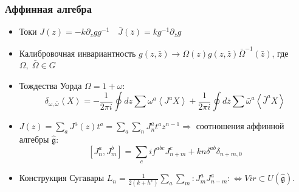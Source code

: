 \documentclass[pdftex]{beamer}
\newcommand{\gfh}{\hat{\mathfrak{g}}}
\theoremstyle{definition} \newtheorem{Def}{Definition}
\begin{document}
\begin{frame}
  \frametitle{Аффинная алгебра}

  \begin{itemize}
  \item   Токи 
    $J(z)= -k \partial_zg g^{-1}\quad \bar J(\bar z)=k g^{-1}\partial_{\bar z}g$

  \item Калибровочная инвариантность $   g(z,\bar z)\to \Omega(z)g(z,\bar z)\bar \Omega^{-1}(\bar z)$,
    где $\Omega,\;\bar \Omega \in G$

  \item Тождества Уорда $\Omega=1+\omega$:
    \begin{equation*}
      \label{eq:87}
      \delta_{\omega,\bar \omega}\left< X \right>=-\frac{1}{2\pi i}\oint dz \sum\omega^a \left< J^a X\right>+
      \frac{1}{2\pi i} \oint d\bar z \sum \bar \omega^a \left< \bar J^a X\right>
    \end{equation*}
  \item  $J(z)=\sum_{a} J^{a}(z) t^{a}=\sum_{a} \sum _{n} J^{a}_{n} t^{a} z^{n-1} \Rightarrow$ соотношения аффинной алгебры $\gfh$: 
    \begin{equation*}
      \left[J^a_n,J^b_m\right]=\sum_c i f^{abc}J^c_{n+m}+kn\delta^{ab}\delta_{n+m,0}
    \end{equation*}
  \item Конструкция Сугавары $  L_n=\frac{1}{2(k+h^v)}\sum\limits_a\sum\limits_m:J^a_m J^a_{n-m}: \Leftrightarrow Vir\subset U(\gfh)$.
  \end{itemize}
\end{frame}
\end{document}
